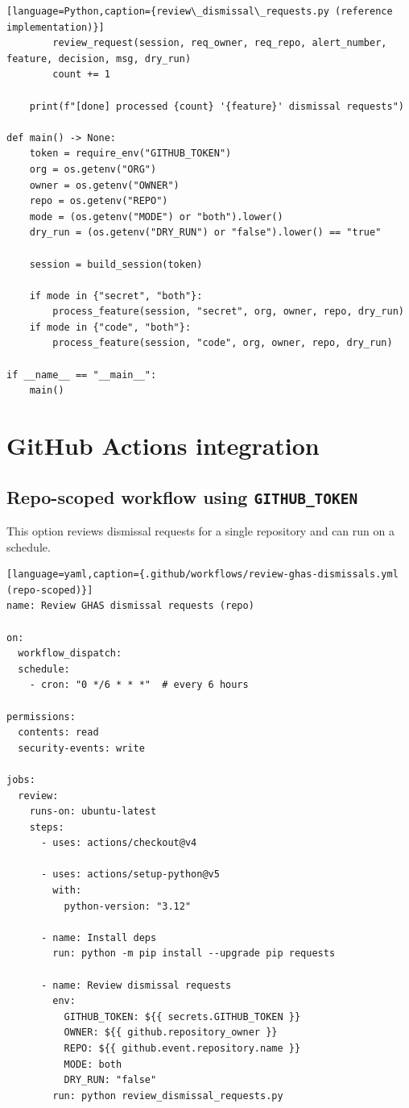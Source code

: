 \documentclass[11pt]{article}
\begin{document}
\begin{verbatim}[language=Python,caption={review\_dismissal\_requests.py (reference implementation)}]
        review_request(session, req_owner, req_repo, alert_number, feature, decision, msg, dry_run)
        count += 1

    print(f"[done] processed {count} '{feature}' dismissal requests")

def main() -> None:
    token = require_env("GITHUB_TOKEN")
    org = os.getenv("ORG")
    owner = os.getenv("OWNER")
    repo = os.getenv("REPO")
    mode = (os.getenv("MODE") or "both").lower()
    dry_run = (os.getenv("DRY_RUN") or "false").lower() == "true"

    session = build_session(token)

    if mode in {"secret", "both"}:
        process_feature(session, "secret", org, owner, repo, dry_run)
    if mode in {"code", "both"}:
        process_feature(session, "code", org, owner, repo, dry_run)

if __name__ == "__main__":
    main()
\end{verbatim}

\section{GitHub Actions integration}

\subsection{Repo-scoped workflow using \texttt{GITHUB\_TOKEN}}

This option reviews dismissal requests for a single repository and can run on a schedule.

\begin{verbatim}[language=yaml,caption={.github/workflows/review-ghas-dismissals.yml (repo-scoped)}]
name: Review GHAS dismissal requests (repo)

on:
  workflow_dispatch:
  schedule:
    - cron: "0 */6 * * *"  # every 6 hours

permissions:
  contents: read
  security-events: write

jobs:
  review:
    runs-on: ubuntu-latest
    steps:
      - uses: actions/checkout@v4

      - uses: actions/setup-python@v5
        with:
          python-version: "3.12"

      - name: Install deps
        run: python -m pip install --upgrade pip requests

      - name: Review dismissal requests
        env:
          GITHUB_TOKEN: ${{ secrets.GITHUB_TOKEN }}
          OWNER: ${{ github.repository_owner }}
          REPO: ${{ github.event.repository.name }}
          MODE: both
          DRY_RUN: "false"
        run: python review_dismissal_requests.py
\end{verbatim}
\end{document}
